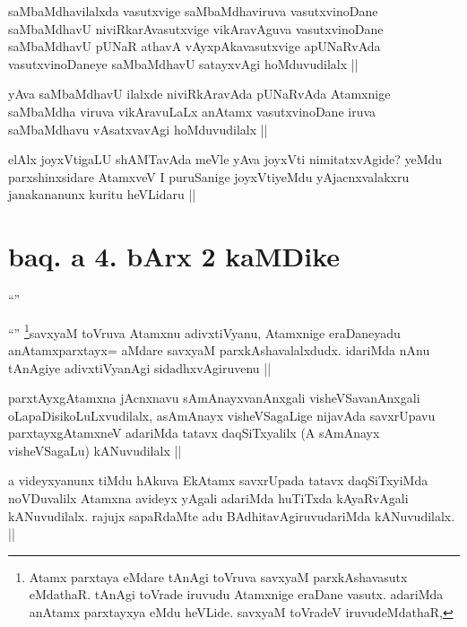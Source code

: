 \begin{artha}
saMbaMdhavilalxda vasutxvige saMbaMdhaviruva vasutxvinoDane saMbaMdhavU niviRkarAvasutxvige vikAravAguva vasutxvinoDane saMbaMdhavU pUNaR athavA vAyxpAkavasutxvige apUNaRvAda vasutxvinoDaneye saMbaMdhavU satayxvAgi hoMduvudilalx || 

yAva saMbaMdhavU ilalxde niviRkAravAda pUNaRvAda Atamxnige saMbaMdha viruva vikAravuLaLx anAtamx vasutxvinoDane iruva saMbaMdhavu vAsatxvavAgi hoMduvudilalx ||
\end{artha}

\begin{artha}
elAlx joyxVtigaLU shAMTavAda meVle yAva joyxVti nimitatxvAgide? yeMdu parxshinxsidare AtamxveV I puruSanige joyxVtiyeMdu yAjacnxvalakxru janakananunx kuritu heVLidaru ||
\end{artha}

\section*{baq. a 4. bArx 2 kaMDike}
\begin{artha}
``\stext''
\end{artha}

\begin{artha}
``\stext'' \footnote{Atamx parxtaya eMdare tAnAgi toVruva savxyaM parxkAshavasutx eMdathaR. tAnAgi toVrade iruvudu Atamxnige eraDane vasutx. adariMda anAtamx parxtayxya eMdu heVLide. savxyaM toVradeV iruvudeMdathaR,}savxyaM toVruva Atamxnu adivxtiVyanu, Atamxnige eraDaneyadu anAtamxparxtayx= aMdare savxyaM parxkAshavalalxdudx. idariMda nAnu tAnAgiye adivxtiVyanAgi sidadhxvAgiruvenu ||
\end{artha}

\begin{artha}
parxtAyxgAtamxna jAcnxnavu sAmAnayxvanAnxgali visheVSavanAnxgali oLapaDisikoLuLxvudilalx, asAmAnayx visheVSagaLige nijavAda savxrUpavu parxtayxgAtamxneV adariMda tatavx daqSiTxyalilx (A sAmAnayx visheVSagaLu) kANuvudilalx ||
\end{artha}

\begin{artha}
a videyxyanunx tiMdu hAkuva EkAtamx savxrUpada tatavx daqSiTxyiMda noVDuvalilx Atamxna avideyx yAgali adariMda huTiTxda kAyaRvAgali kANuvudilalx. rajujx sapaRdaMte adu BAdhitavAgiruvudariMda kANuvudilalx. ||
\end{artha}

